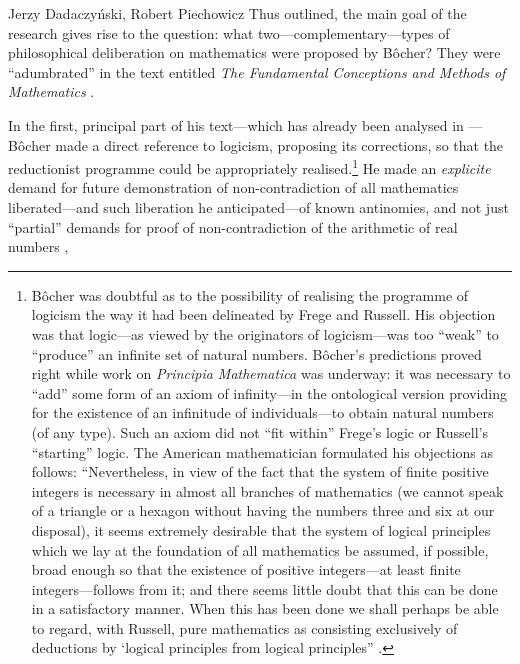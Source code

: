 \begin{artengenv}{Jerzy Dadaczyński, Robert Piechowicz}
Thus outlined, the main goal of the research gives rise to the question: what two---complementary---types of philosophical deliberation on mathematics were proposed by Bôcher? They were ``adumbrated'' in the text entitled \textit{The Fundamental Conceptions and Methods of Mathematics}
\parencite[][]{bocher_fundamental_1904}.


In the first, principal part of his text---which has already been analysed in
\parencite[][]{dadaczynski_tendencje_2015}---Bôcher made a direct reference to logicism, proposing its corrections, so that the reductionist programme could be appropriately realised.\footnote{Bôcher was doubtful as to the possibility of realising the programme of logicism the way it had been delineated by Frege and Russell. His objection was that logic---as viewed by the originators of logicism---was too ``weak'' to ``produce'' an infinite set of natural numbers. Bôcher's predictions proved right while work on \textit{Principia Mathematica} was underway: it was necessary to ``add'' some form of an axiom of infinity---in the ontological version providing for the existence of an infinitude of individuals---to obtain natural numbers (of any type). Such an axiom did not ``fit within'' Frege's logic or Russell's ``starting'' logic. The American mathematician formulated his objections as follows: ``Nevertheless, in view of the fact that the system of finite positive integers is necessary in almost all branches of mathematics (we cannot speak of a triangle or a hexagon without having the numbers three and six at our disposal), it seems extremely desirable that the system of logical principles which we lay at the foundation of all mathematics be assumed, if possible, broad enough so that the existence of positive integers---at least finite integers---follows from it; and there seems little doubt that this can be done in a satisfactory manner. When this has been done we shall perhaps be able to regard, with Russell, pure mathematics as consisting exclusively of deductions by ‘logical principles from logical principles'' 
\parencite[][p.132]{bocher_fundamental_1904}.%
} He made an \textit{explicite} demand for future demonstration of non-contradiction of all mathematics liberated---and such liberation he anticipated---of known antinomies, and not just ``partial'' demands for proof of non-contradiction of the arithmetic of real numbers 
\parencite[][]{hilbert_uber_1900},

\end{artengenv}
